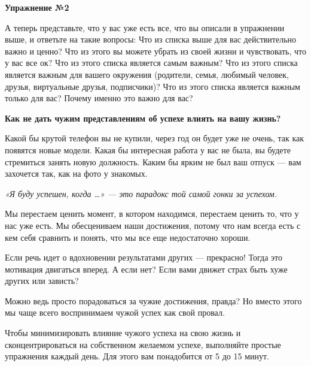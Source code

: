 \textbf{Упражнение №2}

А теперь представьте, что у вас уже есть все, что вы описали в упражнении выше, и ответьте на такие вопросы: Что из списка выше для вас действительно важно и ценно? Что из этого вы можете убрать из своей жизни и чувствовать, что у вас все ок? Что из этого списка является самым важным? Что из этого списка является важным для вашего окружения (родители, семья, любимый человек, друзья, виртуальные друзья, подписчики)? Что из этого списка является важным только для вас? Почему именно это важно для вас?

\textbf{Как не дать чужим представлениям об успехе влиять на вашу жизнь?}

Какой бы крутой телефон вы не купили, через год он будет уже не очень, так как появятся новые модели. Какая бы интересная работа у вас не была, вы будете стремиться занять новую должность. Каким бы ярким не был ваш отпуск — вам захочется так, как на фото у знакомых.

{\it
«Я буду успешен, когда …» — это парадокс той самой гонки за успехом.
}

Мы перестаем ценить момент, в котором находимся, перестаем ценить то, что у нас уже есть. Мы обесцениваем наши достижения, потому что нам всегда есть с кем себя сравнить и понять, что мы все еще недостаточно хороши.

\begin{fancyquotes}
    Если речь идет о вдохновении результатами других — прекрасно! Тогда это мотивация двигаться вперед. А если нет? Если вами движет страх быть хуже других или зависть?
\end{fancyquotes}

Можно ведь просто порадоваться за чужие достижения, правда? Но вместо этого мы чаще всего воспринимаем чужой успех как свой провал.

Чтобы минимизировать влияние чужого успеха на свою жизнь и сконцентрироваться на собственном желаемом успехе, выполняйте простые упражнения каждый день. Для этого вам понадобится от 5 до 15 минут.


